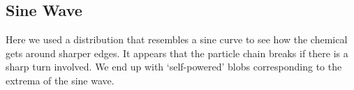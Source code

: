 \begin{minipage}{0.45\textwidth}
\subsection{Sine Wave}
Here we used a distribution that resembles a sine curve to see how the chemical gets around sharper edges.
It appears that the particle chain breaks if there is a sharp turn involved.
We end up with \lq{}self-powered\rq{} blobs corresponding to the extrema of the sine wave.
\end{minipage}